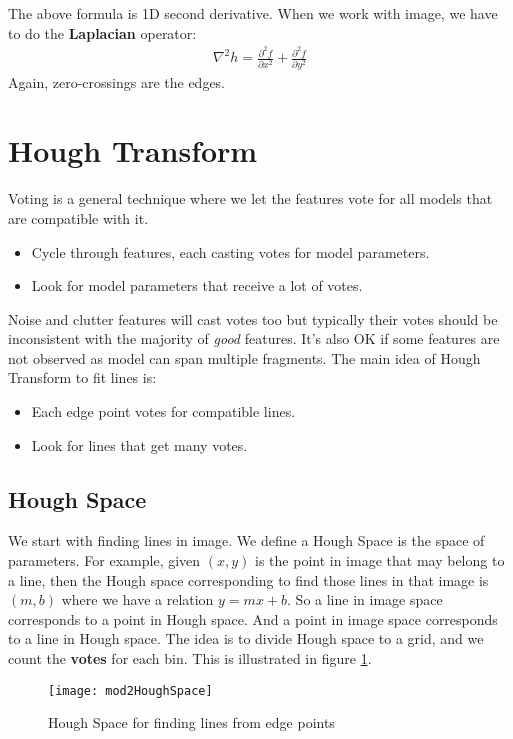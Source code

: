 The above formula is 1D second derivative. When we work with image, we have to do the \textbf{Laplacian} operator:
\begin{align}
\nabla^2 h = \frac{\partial^2 f}{\partial x^2} + \frac{\partial^2 f}{\partial y^2}
\end{align}
Again, zero-crossings are the edges.

\section{Hough Transform}
\begin{defi}[Voting]
Voting is a general technique where we let the features vote for all models that are compatible with it.
\begin{itemize}
\item Cycle through features, each casting votes for model parameters.
\item Look for model parameters that receive a lot of votes.
\end{itemize}
\end{defi}
Noise and clutter features will cast votes too but typically their votes should be inconsistent with the majority of \textit{good} features. It's also OK if some features are not observed as model can span multiple fragments. The main idea of Hough Transform to fit lines is:
\begin{itemize}
\item Each edge point votes for compatible lines.
\item Look for lines that get many votes.
\end{itemize}

\subsection{Hough Space}
We start with finding lines in image. We define a Hough Space is the space of parameters. For example, given $(x, y)$ is the point in image that may belong to a line, then the Hough space corresponding to find those lines in that image is $(m ,b)$ where we have a relation $y = mx + b$. So a line in image space corresponds to a point in Hough space. And a point in image space corresponds to a line in Hough space. The idea is to divide Hough space to a grid, and we count the \textbf{votes} for each bin. This is illustrated in figure \ref{mod2HoughSpace}.

\begin{figure}
\centering
\texttt{[image: mod2HoughSpace]}
\caption{Hough Space for finding lines from edge points}
\label{mod2HoughSpace}
\end{figure} 



